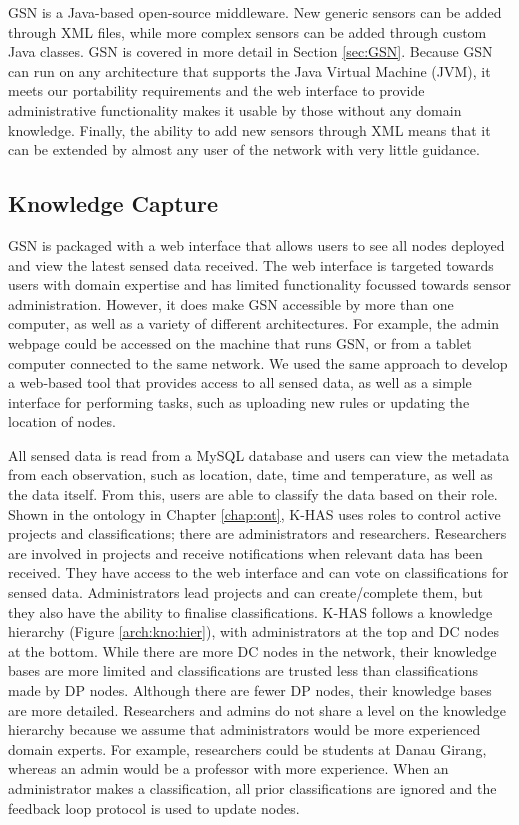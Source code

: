 	GSN is a Java-based open-source middleware. New generic sensors can be added through XML files, while more complex sensors can be added through custom Java classes. GSN is covered in more detail in Section \ref{sec:GSN}. Because GSN can run on any architecture that supports the Java Virtual Machine (JVM), it meets our portability requirements and the web interface to provide administrative functionality makes it usable by those without any domain knowledge. Finally, the ability to add new sensors through XML means that it can be extended by almost any user of the network with very little guidance.
		
	\subsection{Knowledge Capture}\label{arch:kc}
		GSN is packaged with a web interface that allows users to see all nodes deployed and view the latest sensed data received. The web interface is targeted towards users with domain expertise and has limited functionality focussed towards sensor administration. However, it does make GSN accessible by more than one computer, as well as a variety of different architectures. For example, the admin webpage could be accessed on the machine that runs GSN, or from a tablet computer connected to the same network. We used the same approach to develop a web-based tool that provides access to all sensed data, as well as a simple interface for performing tasks, such as uploading new rules or updating the location of nodes.
		
		All sensed data is read from a MySQL database and users can view the metadata from each observation, such as location, date, time and temperature, as well as the data itself. From this, users are able to classify the data based on their role. Shown in the ontology in Chapter \ref{chap:ont}, K-HAS uses roles to control active projects and classifications; there are administrators and researchers. Researchers are involved in projects and receive notifications when relevant data has been received. They have access to the web interface and can vote on classifications for sensed data. Administrators lead projects and can create/complete them, but they also have the ability to finalise classifications. K-HAS follows a knowledge hierarchy (Figure \ref{arch:kno:hier}), with administrators at the top and DC nodes at the bottom. While there are more DC nodes in the network, their knowledge bases are more limited and classifications are trusted less than classifications made by DP nodes. Although there are fewer DP nodes, their knowledge bases are more detailed. Researchers and admins do not share a level on the knowledge hierarchy because we assume that administrators would be more experienced domain experts. For example, researchers could be students at Danau Girang, whereas an admin would be a professor with more experience. When an administrator makes a classification, all prior classifications are ignored and the feedback loop protocol is used to update nodes.


